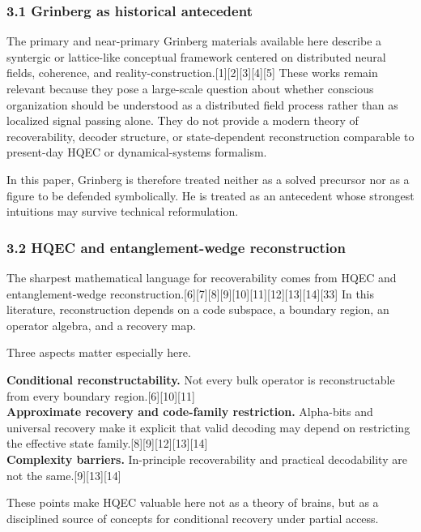 \documentclass[
]{article}
\begin{document}
\subsubsection{3.1 Grinberg as historical
antecedent}\label{grinberg-as-historical-antecedent}

The primary and near-primary Grinberg materials available here describe
a syntergic or lattice-like conceptual framework centered on distributed
neural fields, coherence, and
reality-construction.{[}1{]}{[}2{]}{[}3{]}{[}4{]}{[}5{]} These works
remain relevant because they pose a large-scale question about whether
conscious organization should be understood as a distributed field
process rather than as localized signal passing alone. They do not
provide a modern theory of recoverability, decoder structure, or
state-dependent reconstruction comparable to present-day HQEC or
dynamical-systems formalism.

In this paper, Grinberg is therefore treated neither as a solved
precursor nor as a figure to be defended symbolically. He is treated as
an antecedent whose strongest intuitions may survive technical
reformulation.

\subsubsection{3.2 HQEC and entanglement-wedge
reconstruction}\label{hqec-and-entanglement-wedge-reconstruction}

The sharpest mathematical language for recoverability comes from HQEC
and entanglement-wedge
reconstruction.{[}6{]}{[}7{]}{[}8{]}{[}9{]}{[}10{]}{[}11{]}{[}12{]}{[}13{]}{[}14{]}{[}33{]}
In this literature, reconstruction depends on a code subspace, a
boundary region, an operator algebra, and a recovery map.

Three aspects matter especially here.

\textbf{Conditional reconstructability.} Not every bulk operator is
reconstructable from every boundary region.{[}6{]}{[}10{]}{[}11{]}\\
\textbf{Approximate recovery and code-family restriction.} Alpha-bits
and universal recovery make it explicit that valid decoding may depend
on restricting the effective state
family.{[}8{]}{[}9{]}{[}12{]}{[}13{]}{[}14{]}\\
\textbf{Complexity barriers.} In-principle recoverability and practical
decodability are not the same.{[}9{]}{[}13{]}{[}14{]}

These points make HQEC valuable here not as a theory of brains, but as a
disciplined source of concepts for conditional recovery under partial
access.
\end{document}
